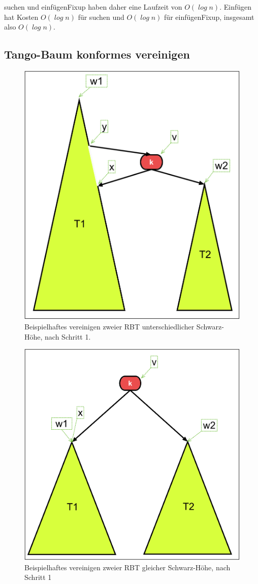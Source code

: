 \documentclass[a4paper,12pt]{article}
\begin{document}
\noindent suchen und einfügenFixup haben daher eine Laufzeit von $\mathit{O(\log {n})}$. Einfügen hat  Kosten $\mathit{O(\log {n})}$ für suchen und  $\mathit{O(\log {n})}$ für einfügenFixup, insgesamt also  $\mathit{O(\log {n})}$.


\subsection{Tango-Baum konformes vereinigen} \label{vereinigen}
\begin{figure}[h]
	\centering
	\includegraphics[height= 0.6\textwidth]{"Medien/RotSchwarzBaum/vereinigen"}
	\caption{Beispielhaftes vereinigen zweier RBT unterschiedlicher Schwarz-Höhe, nach Schritt 1. }
	\label{fig:vereinigen}
\end{figure}
\begin{figure}[h]
	\centering
	\includegraphics[height= 0.6\textwidth]{"Medien/RotSchwarzBaum/vereinigen2"}
	\caption{Beispielhaftes vereinigen zweier RBT gleicher Schwarz-Höhe, nach Schritt 1 }
	\label{fig:vereinigen2}
\end{figure}
\end{document}
